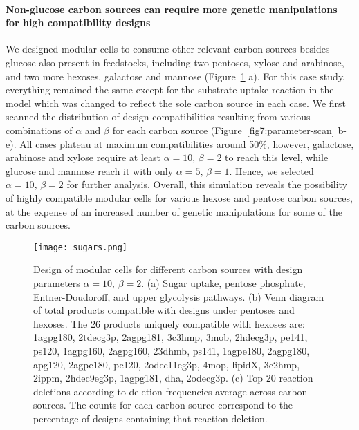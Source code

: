 {\paragraph{Non-glucose carbon sources can require more genetic manipulations for high compatibility designs}
We designed modular cells to consume other relevant carbon sources besides glucose also present in feedstocks, including two pentoses, xylose and arabinose, and two more hexoses, galactose and mannose (Figure~\ref{fig7:sugars} a).
For this case study, everything remained the same except for the substrate uptake reaction in the model which was changed to reflect the sole carbon source in each case.
We first scanned the distribution of design compatibilities resulting from various combinations of $\alpha$ and $\beta$ for each carbon source (Figure~\ref{fig7:parameter-scan} b-e).
All cases plateau at maximum compatibilities around 50\%, however, galactose, arabinose and xylose require at least $\alpha=10, \, \beta=2$ to reach this level, while glucose and mannose reach it with only $\alpha=5, \, \beta=1$.
Hence, we selected $\alpha=10, \, \beta=2$ for further analysis.
Overall, this simulation reveals the possibility of highly compatible modular cells for various hexose and pentose carbon sources, at the expense of an increased number of genetic manipulations for some of the carbon sources.

\begin{figure}[hp]
    \centering
    \texttt{[image: sugars.png]}
    \caption[Design of modular cells for different carbon sources ]{Design of modular cells for different carbon sources with design parameters $\alpha=10, \, \beta=2$. (a) Sugar uptake, pentose phosphate, Entner-Doudoroff, and upper glycolysis pathways. (b) Venn diagram of total products compatible with designs under pentoses and hexoses.
    The 26 products uniquely compatible with hexoses are:
    1agpg180, 2tdecg3p, 2agpg181, 3c3hmp, 3mob, 2hdecg3p, pe141, ps120, 1agpg160, 2agpg160, 23dhmb, ps141, 1agpe180, 2agpg180, apg120, 2agpe180, pe120, 2odec11eg3p, 4mop, lipidX, 3c2hmp, 2ippm, 2hdec9eg3p, 1agpg181, dha, 2odecg3p.
    (c) Top 20 reaction deletions according to deletion frequencies average across carbon sources. The counts for each carbon source correspond to the percentage of designs containing that reaction deletion.}
    \label{fig7:sugars}
\end{figure}


}
